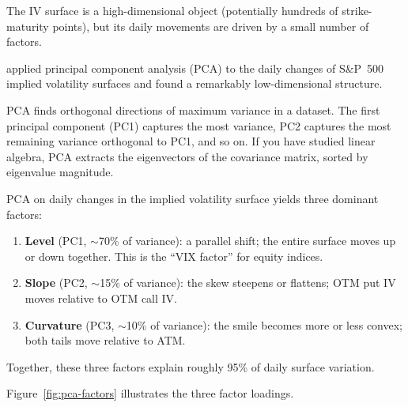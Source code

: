 The IV surface is a high-dimensional object (potentially hundreds of strike-maturity points), but its daily movements are driven by a small number of factors.

\citet{Cont2002} applied principal component analysis (PCA) to the daily changes of S\&P~500 implied volatility surfaces and found a remarkably low-dimensional structure.

\begin{prereq}
PCA finds orthogonal directions of maximum variance in a dataset.
The first principal component (PC1) captures the most variance, PC2 captures the most remaining variance orthogonal to PC1, and so on.
If you have studied linear algebra, PCA extracts the eigenvectors of the covariance matrix, sorted by eigenvalue magnitude.
\end{prereq}

\begin{keyresult}
\label{res:pca-iv}
PCA on daily changes in the implied volatility surface yields three dominant factors:
\begin{enumerate}[nosep]
  \item \textbf{Level} (PC1, $\sim$70\% of variance): a parallel shift; the entire surface moves up or down together.
  This is the ``VIX factor'' for equity indices.
  \item \textbf{Slope} (PC2, $\sim$15\% of variance): the skew steepens or flattens; OTM put IV moves relative to OTM call IV.
  \item \textbf{Curvature} (PC3, $\sim$10\% of variance): the smile becomes more or less convex; both tails move relative to ATM.
\end{enumerate}
Together, these three factors explain roughly 95\% of daily surface variation.
\end{keyresult}

Figure~\ref{fig:pca-factors} illustrates the three factor loadings.

